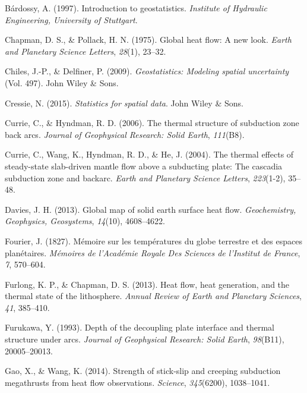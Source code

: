 \documentclass[draft,linenumbers]{agujournal2018}
\begin{document}
\hypertarget{refs_main}{}
\leavevmode{}%
Bárdossy, A. (1997). Introduction to geostatistics. \emph{Institute of
Hydraulic Engineering, University of Stuttgart}.

\leavevmode{}%
Chapman, D. S., \& Pollack, H. N. (1975). Global heat flow: A new look.
\emph{Earth and Planetary Science Letters}, \emph{28}(1), 23--32.

\leavevmode{}%
Chiles, J.-P., \& Delfiner, P. (2009). \emph{Geostatistics: Modeling
spatial uncertainty} (Vol. 497). John Wiley \& Sons.

\leavevmode{}%
Cressie, N. (2015). \emph{Statistics for spatial data}. John Wiley \&
Sons.

\leavevmode{}%
Currie, C., \& Hyndman, R. D. (2006). The thermal structure of
subduction zone back arcs. \emph{Journal of Geophysical Research: Solid
Earth}, \emph{111}(B8).

\leavevmode{}%
Currie, C., Wang, K., Hyndman, R. D., \& He, J. (2004). The thermal
effects of steady-state slab-driven mantle flow above a subducting
plate: The cascadia subduction zone and backarc. \emph{Earth and
Planetary Science Letters}, \emph{223}(1-2), 35--48.

\leavevmode{}%
Davies, J. H. (2013). Global map of solid earth surface heat flow.
\emph{Geochemistry, Geophysics, Geosystems}, \emph{14}(10), 4608--4622.

\leavevmode{}%
Fourier, J. (1827). M{é}moire sur les temp{é}ratures du globe terrestre
et des espaces plan{é}taires. \emph{M{é}moires de l'Acad{é}mie Royale
Des Sciences de l'Institut de France}, \emph{7}, 570--604.

\leavevmode{}%
Furlong, K. P., \& Chapman, D. S. (2013). Heat flow, heat generation,
and the thermal state of the lithosphere. \emph{Annual Review of Earth
and Planetary Sciences}, \emph{41}, 385--410.

\leavevmode{}%
Furukawa, Y. (1993). Depth of the decoupling plate interface and thermal
structure under arcs. \emph{Journal of Geophysical Research: Solid
Earth}, \emph{98}(B11), 20005--20013.

\leavevmode{}%
Gao, X., \& Wang, K. (2014). Strength of stick-slip and creeping
subduction megathrusts from heat flow observations. \emph{Science},
\emph{345}(6200), 1038--1041.
\end{document}
